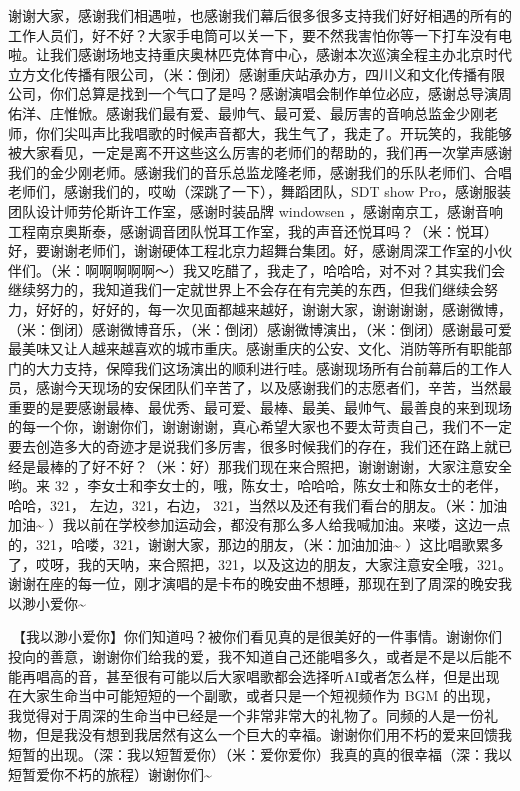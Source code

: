 \documentclass[
]{book}
\begin{document}
谢谢大家，感谢我们相遇啦，也感谢我们幕后很多很多支持我们好好相遇的所有的工作人员们，好不好？大家手电筒可以关一下，要不然我害怕你等一下打车没有电啦。让我们感谢场地支持重庆奥林匹克体育中心，感谢本次巡演全程主办北京时代立方文化传播有限公司，（米：倒闭）感谢重庆站承办方，四川义和文化传播有限公司，你们总算是找到一个气口了是吗？感谢演唱会制作单位必应，感谢总导演周佑洋、庄惟惞。感谢我们最有爱、最帅气、最可爱、最厉害的音响总监金少刚老师，你们尖叫声比我唱歌的时候声音都大，我生气了，我走了。开玩笑的，我能够被大家看见，一定是离不开这些这么厉害的老师们的帮助的，我们再一次掌声感谢我们的金少刚老师。感谢我们的音乐总监龙隆老师，感谢我们的乐队老师们、合唱老师们，感谢我们的，哎呦（深跳了一下），舞蹈团队，SDT show Pro，感谢服装团队设计师劳伦斯许工作室，感谢时装品牌 windowsen ，感谢南京工，感谢音响工程南京奥斯泰，感谢调音团队悦耳工作室，我的声音还悦耳吗？（米：悦耳）好，要谢谢老师们，谢谢硬体工程北京力超舞台集团。好，感谢周深工作室的小伙伴们。（米：啊啊啊啊啊～）我又吃醋了，我走了，哈哈哈，对不对？其实我们会继续努力的，我知道我们一定就世界上不会存在有完美的东西，但我们继续会努力，好好的，好好的，每一次见面都越来越好，谢谢大家，谢谢谢谢，感谢微博，（米：倒闭）感谢微博音乐，（米：倒闭）感谢微博演出，（米：倒闭）感谢最可爱最美味又让人越来越喜欢的城市重庆。感谢重庆的公安、文化、消防等所有职能部门的大力支持，保障我们这场演出的顺利进行哇。感谢现场所有台前幕后的工作人员，感谢今天现场的安保团队们辛苦了，以及感谢我们的志愿者们，辛苦，当然最重要的是要感谢最棒、最优秀、最可爱、最棒、最美、最帅气、最善良的来到现场的每一个你，谢谢你们，谢谢谢谢，真心希望大家也不要太苛责自己，我们不一定要去创造多大的奇迹才是说我们多厉害，很多时候我们的存在，我们还在路上就已经是最棒的了好不好？（米：好）那我们现在来合照把，谢谢谢谢，大家注意安全哟。来 32 ，李女士和李女士的，哦，陈女士，哈哈哈，陈女士和陈女士的老伴，哈哈，321， 左边，321，右边， 321，当然以及还有我们看台的朋友。（米：加油加油\textasciitilde{} ）我以前在学校参加运动会，都没有那么多人给我喊加油。来喽，这边一点的，321，哈喽，321，谢谢大家，那边的朋友，（米：加油加油\textasciitilde{} ）这比唱歌累多了，哎呀，我的天呐，来合照把，321，以及这边的朋友，大家注意安全哦，321。谢谢在座的每一位，刚才演唱的是卡布的晚安曲不想睡，那现在到了周深的晚安我以渺小爱你\textasciitilde{}

🎵【我以渺小爱你】你们知道吗？被你们看见真的是很美好的一件事情。谢谢你们投向的善意，谢谢你们给我的爱，我不知道自己还能唱多久，或者是不是以后能不能再唱高的音，甚至很有可能以后大家唱歌都会选择听AI或者怎么样，但是出现在大家生命当中可能短短的一个副歌，或者只是一个短视频作为 BGM 的出现，我觉得对于周深的生命当中已经是一个非常非常大的礼物了。同频的人是一份礼物，但是我没有想到我居然有这么一个巨大的幸福。谢谢你们用不朽的爱来回馈我短暂的出现。（深：我以短暂爱你）（米：爱你爱你）我真的真的很幸福（深：我以短暂爱你不朽的旅程）谢谢你们\textasciitilde{}
\end{document}
